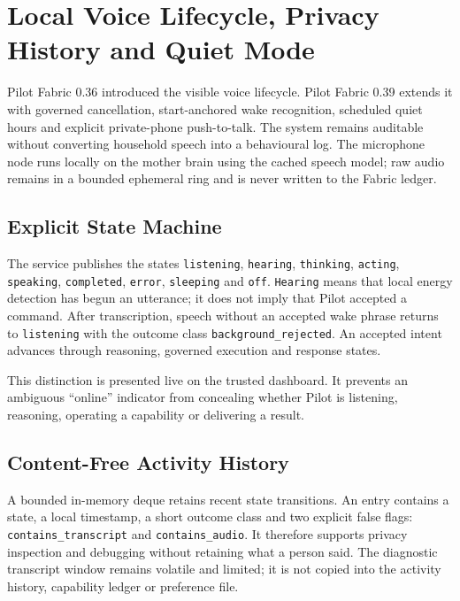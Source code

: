 \section{Local Voice Lifecycle, Privacy History and Quiet Mode}
\label{sec:pilot-voice-lifecycle}

Pilot Fabric 0.36 introduced the visible voice lifecycle. Pilot Fabric 0.39
extends it with governed cancellation, start-anchored wake recognition,
scheduled quiet hours and explicit private-phone push-to-talk. The system
remains auditable without converting household speech into a behavioural log. The
microphone node runs locally on the mother brain using the cached speech model;
raw audio remains in a bounded ephemeral ring and is never written to the Fabric
ledger.

\subsection{Explicit State Machine}

The service publishes the states \texttt{listening}, \texttt{hearing},
\texttt{thinking}, \texttt{acting}, \texttt{speaking}, \texttt{completed},
\texttt{error}, \texttt{sleeping} and \texttt{off}.  \texttt{Hearing} means
that local energy detection has begun an utterance; it does not imply that Pilot
accepted a command.  After transcription, speech without an accepted wake phrase
returns to \texttt{listening} with the outcome class
\texttt{background\_rejected}.  An accepted intent advances through reasoning,
governed execution and response states.

This distinction is presented live on the trusted dashboard.  It prevents an
ambiguous ``online'' indicator from concealing whether Pilot is listening,
reasoning, operating a capability or delivering a result.

\subsection{Content-Free Activity History}

A bounded in-memory deque retains recent state transitions.  An entry contains a
state, a local timestamp, a short outcome class and two explicit false flags:
\texttt{contains\_transcript} and \texttt{contains\_audio}.  It therefore
supports privacy inspection and debugging without retaining what a person said.
The diagnostic transcript window remains volatile and limited; it is not copied
into the activity history, capability ledger or preference file.

